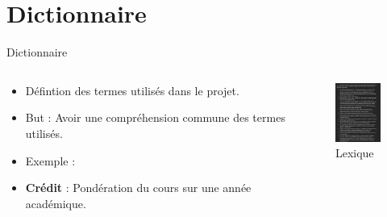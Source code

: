 \documentclass[numbering=fraction]{beamer}
\begin{document}
\section{Dictionnaire}
\begin{frame}{Dictionnaire}
    \begin{columns}
        \begin{column}{0.75\textwidth}
            \begin{itemize}
                \item Défintion des termes utilisés dans le projet.
                \item But : Avoir une compréhension commune des termes utilisés.
                \item Exemple :
                \item \textbf{Crédit} : Pondération du cours sur une année académique.
            \end{itemize}
        \end{column}
        \begin{column}{0.25\textwidth}
            \begin{figure}
                \centering
                \includegraphics[width=2cm]{1.png}
                \caption{Lexique}
            \end{figure}

        \end{column}
    \end{columns}
\end{frame}
\end{document}
